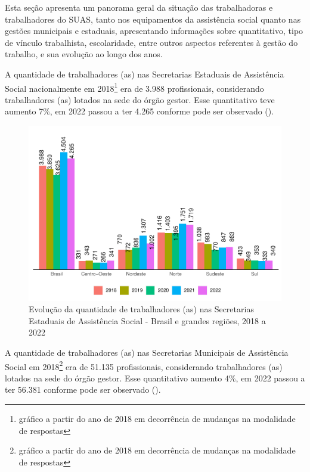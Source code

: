 \documentclass[
  brazilian]{report}
\begin{document}
Esta seção apresenta um panorama geral da situação das trabalhadoras e
trabalhadores do SUAS, tanto nos equipamentos da assistência social
quanto nas gestões municipais e estaduais, apresentando informações
sobre quantitativo, tipo de vínculo trabalhista, escolaridade, entre
outros aspectos referentes à gestão do trabalho, e sua evolução ao longo
dos anos.

A quantidade de trabalhadores (as) nas Secretarias Estaduais de
Assistência Social nacionalmente em
2018\footnote{gráfico a partir do ano de 2018 em decorrência de mudanças na modalidade de respostas}
era de 3.988 profissionais, considerando trabalhadores (as) lotados na
sede do órgão gestor. Esse quantitativo teve aumento 7\%, em 2022 passou
a ter 4.265 conforme pode ser observado ().

\begin{figure}
\includegraphics{Censo-SUAS-2022_files/figure-latex/qtd-trab-uf-1} \caption[Evolução da quantidade de trabalhadores (as) nas Secretarias Estaduais de Assistência Social - Brasil e grandes regiões, 2018 a 2022]{Evolução da quantidade de trabalhadores (as) nas Secretarias Estaduais de Assistência Social - Brasil e grandes regiões, 2018 a 2022}\label{fig:qtd-trab-uf}
\end{figure}

A quantidade de trabalhadores (as) nas Secretarias Municipais de
Assistência Social em
2018\footnote{gráfico a partir do ano de 2018 em decorrência de mudanças na modalidade de respostas}
era de 51.135 profissionais, considerando trabalhadores (as) lotados na
sede do órgão gestor. Esse quantitativo aumento 4\%, em 2022 passou a
ter 56.381 conforme pode ser observado ().
\end{document}

